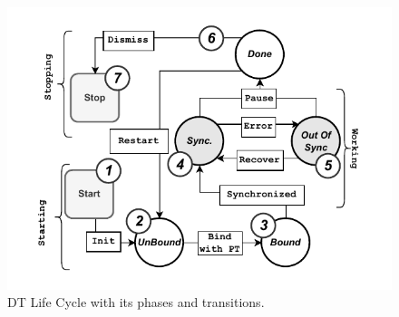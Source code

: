

\begin{figure}[t]
    \centering
    \includegraphics[width=\columnwidth]{figures/wldt_lifecycle_simple.pdf}
    \caption{DT Life Cycle with its phases and transitions.}
    \label{fig:dt_life_cycle}
\end{figure}


